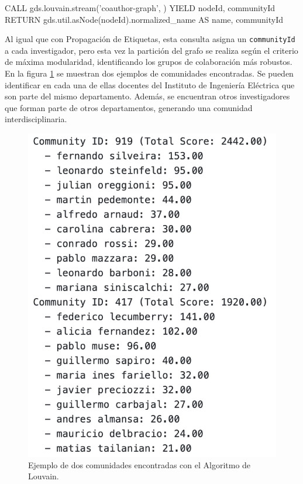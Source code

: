 \documentclass[journal]{IEEEtran}
\begin{document}
\begin{sflisting}[style=sparql,caption= Detección de comunidades con el algoritmo de Louvain,label=codigo_louvain]
	CALL gds.louvain.stream('coauthor-graph', {})
	YIELD nodeId, communityId
	RETURN gds.util.asNode(nodeId).normalized_name
	AS name, communityId
\end{sflisting}

Al igual que con Propagación de Etiquetas, esta consulta asigna un \texttt{communityId} a cada investigador, pero esta vez la partición del grafo se realiza según el criterio de máxima modularidad, identificando los grupos de colaboración más robustos. En la figura \ref{fig:comunidades} se muestran dos ejemplos de comunidades encontradas. Se pueden identificar en cada una de ellas docentes del Instituto de Ingeniería Eléctrica que son parte del mismo departamento. Además, se encuentran otros investigadores que forman parte de otros departamentos, generando una comunidad interdisciplinaria.

\begin{figure}[htb]
	\centering
	\includegraphics[width=\linewidth]{imagenes/comunidades.png}
	\caption{Ejemplo de dos comunidades encontradas con el Algoritmo de Louvain.}
	\label{fig:comunidades}
\end{figure}
\end{document}
